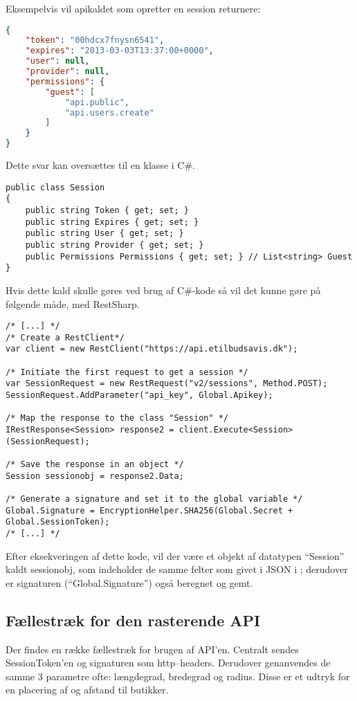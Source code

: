 Eksempelvis vil apikaldet som opretter en session returnere:
\begin{lstlisting}[language=json,firstnumber=1,caption="POST til sessions api'en med APIKEYen",label=apilst1]
{
    "token": "00hdcx7fnysn6541",
    "expires": "2013-03-03T13:37:00+0000",
    "user": null,
    "provider": null,
    "permissions": {
        "guest": [
            "api.public",
            "api.users.create"
        ]
    }
}
\end{lstlisting}

Dette svar kan oversættes til en klasse i C\#.
\begin{lstlisting}[caption="Klassen ``Session'' som svarer til retur JSONet sendt fra /v2/sessions' APIet"]
public class Session
{
    public string Token { get; set; }
    public string Expires { get; set; }
    public string User { get; set; }
    public string Provider { get; set; }
    public Permissions Permissions { get; set; } // List<string> Guest 
}
\end{lstlisting}

Hvis dette kald skulle gøres ved brug af C\#-kode så vil det kunne gøre på følgende måde, med RestSharp.
\begin{lstlisting}[caption="C\#-kode som opretter en RestClient og anvender den til at oprette et objekt med felter som svarer til JSON dataet givet fra API'en"]
/* [...] */
/* Create a RestClient*/
var client = new RestClient("https://api.etilbudsavis.dk");

/* Initiate the first request to get a session */
var SessionRequest = new RestRequest("v2/sessions", Method.POST);
SessionRequest.AddParameter("api_key", Global.Apikey);

/* Map the response to the class "Session" */
IRestResponse<Session> response2 = client.Execute<Session>(SessionRequest);

/* Save the response in an object */
Session sessionobj = response2.Data;

/* Generate a signature and set it to the global variable */
Global.Signature = EncryptionHelper.SHA256(Global.Secret + Global.SessionToken);
/* [...] */
\end{lstlisting}
Efter eksekveringen af dette kode, vil der være et objekt af datatypen ``Session'' kaldt sessionobj, som indeholder de samme felter som givet i JSON i ; derudover er signaturen (``Global.Signature'') også beregnet og gemt. 

\subsection{Fællestræk for den rasterende API}
Der findes en række fællestræk for brugen af API'en.
Centralt sendes SessionToken'en og signaturen som http--headers.
Derudover genanvendes de samme 3 parametre ofte: længdegrad, bredegrad og radius.
Disse er et udtryk for en placering af og afstand til butikker.

